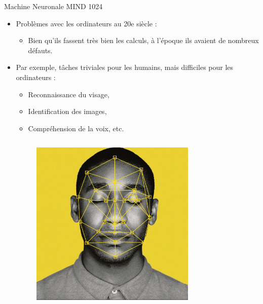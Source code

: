 \documentclass{beamer}
\begin{document}
\begin{frame}{Machine Neuronale MIND 1024}
    \begin{itemize}[<+-| alert@+>] %
        \item Problèmes avec les ordinateurs au 20e siècle :
            \begin{itemize}[<+-| alert@+>] %
                \item Bien qu'ils fassent très bien les calculs, à l'époque ils avaient de nombreux défauts.
            \end{itemize}
        \item Par exemple, tâches triviales pour les humains, mais difficiles pour les ordinateurs :
            \begin{itemize}[<+-| alert@+>] %
                \item Reconnaissance du visage,
                \item Identification des images,
                \item Compréhension de la voix, etc.
            \end{itemize}
            \begin{columns}[T]
                \begin{figure}
                \centering
                \includegraphics[width=0.65\linewidth]{pic/Reconnaissance-du-visage.png}
                \end{figure}
                \begin{figure}
                \centering

\end{figure}
\end{columns}
\end{itemize}
\end{frame}
\end{document}
